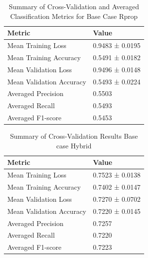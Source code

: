 \documentclass[conference]{IEEEtran}
\begin{document}
\begin{table}[h]
    \centering
    \caption{Summary of Cross-Validation and Averaged Classification Metrics for Base Case Rprop}
    \begin{tabular}{@{}ll@{}}
        \toprule
        \textbf{Metric}                   & \textbf{Value}           \\ 
        \midrule
        Mean Training Loss       & 0.9483 ± 0.0195 \\ 
        Mean Training Accuracy   & 0.5491 ± 0.0182 \\ 
        Mean Validation Loss     & 0.9496 ± 0.0148 \\ 
        Mean Validation Accuracy  & 0.5493 ± 0.0224 \\ 
        \midrule
        Averaged Precision       & 0.5503 \\ 
        Averaged Recall          & 0.5493 \\ 
        Averaged F1-score        & 0.5453 \\ 
        \bottomrule
    \end{tabular}
    \label{tab:combined_metrics_summary_rprop}
\end{table}
\begin{table}[h]
    \centering
    \caption{Summary of Cross-Validation Results Base case Hybrid}
    \begin{tabular}{@{}ll@{}}
        \toprule
        \textbf{Metric}                   & \textbf{Value}           \\ 
        \midrule
        Mean Training Loss       & 0.7523 ± 0.0138 \\ 
        Mean Training Accuracy   & 0.7402 ± 0.0147 \\ 
        Mean Validation Loss     & 0.7270 ± 0.0702 \\ 
        Mean Validation Accuracy  & 0.7220 ± 0.0145 \\ 
        \midrule
        Averaged Precision       & 0.7257 \\ 
        Averaged Recall          & 0.7220 \\ 
        Averaged F1-score        & 0.7223 \\ 
        \bottomrule
    \end{tabular}
    \label{tab:combined_metrics_summary}
\end{table}
\end{document}
